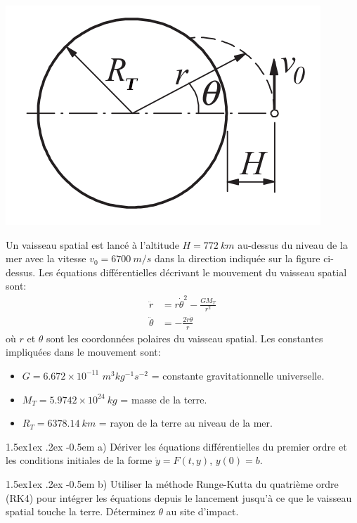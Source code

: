\documentclass[%
oneside,                 %
final,                   %
10pt,french]{article}
\makeatletter
\newenvironment{doconceexercise}{}{}
\newcounter{doconceexercisecounter}
\newcommand\subex{\@startsection{paragraph}{4}{\z@}%
                  {1.5ex\@plus1ex \@minus.2ex}%
                  {-0.5em}%
                  {\normalfont\normalsize\bfseries}}
\makeatother
\begin{document}
\begin{doconceexercise}





\vspace{6mm}

\centerline{\includegraphics[width=0.4\linewidth]{imgs/spacecraft.png}}

\vspace{6mm}



Un vaisseau spatial est lancé à l'altitude $H = 772 \ km$ au-dessus du niveau de la mer avec la vitesse $v_0 = 6700 \ m/s$ dans la direction indiquée sur la figure ci-dessus. Les équations différentielles décrivant le mouvement du vaisseau spatial sont:
\begin{align*}
\ddot{r} &= r \dot{\theta}^2 - \frac{G M_T}{r^2} \\
\ddot{\theta} &= - \frac{2 \dot{r} \dot{\theta}}{r}
\end{align*}
où $r$ et $\theta$ sont les coordonnées polaires du vaisseau spatial. Les constantes impliquées dans le mouvement sont:
\begin{itemize}
\item $G = 6.672 \times 10^{−11}$ $m^3 kg^{−1} s^{−2}$ = constante gravitationnelle universelle.

\item $M_T = 5.9742 \times 10^24 \ kg$ = masse de la terre.

\item $R_T = 6378.14 \ km$ = rayon de la terre au niveau de la mer.
\end{itemize}

\noindent
\subex{a)}
Dériver les équations différentielles du premier ordre et les conditions initiales de la forme $\dot{y} = F (t, y)$, $y(0) = b$.

\subex{b)}
Utiliser la méthode Runge-Kutta du quatrième ordre (RK4) pour intégrer les équations depuis le lancement jusqu'à ce que le vaisseau spatial touche la terre. Déterminez $\theta$ au site d'impact.

\end{doconceexercise}



\end{document}
